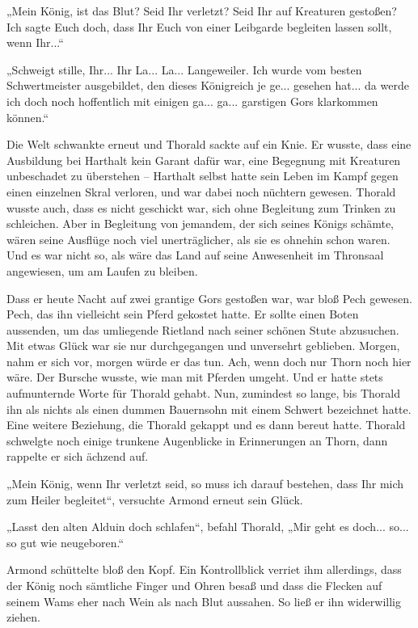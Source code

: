 „Mein König, ist das Blut? Seid Ihr verletzt? Seid Ihr auf Kreaturen gestoßen? Ich sagte Euch doch, dass Ihr Euch von einer Leibgarde begleiten lassen sollt, wenn Ihr...“

„Schweigt stille, Ihr... Ihr La... La... Langeweiler. Ich wurde vom besten Schwertmeister ausgebildet, den dieses Königreich je ge... gesehen hat... da werde ich doch noch hoffentlich mit einigen ga... ga... garstigen Gors klarkommen können.“

Die Welt schwankte erneut und Thorald sackte auf ein Knie. Er wusste, dass eine Ausbildung bei Harthalt kein Garant dafür war, eine Begegnung mit Kreaturen unbeschadet zu überstehen – Harthalt selbst hatte sein Leben im Kampf gegen einen einzelnen Skral verloren, und war dabei noch nüchtern gewesen. Thorald wusste auch, dass es nicht geschickt war, sich ohne Begleitung zum Trinken zu schleichen. Aber in Begleitung von jemandem, der sich seines Königs schämte, wären seine Ausflüge noch viel unerträglicher, als sie es ohnehin schon waren. Und es war nicht so, als wäre das Land auf seine Anwesenheit im Thronsaal angewiesen, um am Laufen zu bleiben.

Dass er heute Nacht auf zwei grantige Gors gestoßen war, war bloß Pech gewesen. Pech, das ihn vielleicht sein Pferd gekostet hatte. Er sollte einen Boten aussenden, um das umliegende Rietland nach seiner schönen Stute abzusuchen. Mit etwas Glück war sie nur durchgegangen und unversehrt geblieben. Morgen, nahm er sich vor, morgen würde er das tun. Ach, wenn doch nur Thorn noch hier wäre. Der Bursche wusste, wie man mit Pferden umgeht. Und er hatte stets aufmunternde Worte für Thorald gehabt. Nun, zumindest so lange, bis Thorald ihn als nichts als einen dummen Bauernsohn mit einem Schwert bezeichnet hatte. Eine weitere Beziehung, die Thorald gekappt und es dann bereut hatte. Thorald schwelgte noch einige trunkene Augenblicke in Erinnerungen an Thorn, dann rappelte er sich ächzend auf.

„Mein König, wenn Ihr verletzt seid, so muss ich darauf bestehen, dass Ihr mich zum Heiler begleitet“, versuchte Armond erneut sein Glück.

„Lasst den alten Alduin doch schlafen“, befahl Thorald, „Mir geht es doch... so... so gut wie neugeboren.“

Armond schüttelte bloß den Kopf. Ein Kontrollblick verriet ihm allerdings, dass der König noch sämtliche Finger und Ohren besaß und dass die Flecken auf seinem Wams eher nach Wein als nach Blut aussahen. So ließ er ihn widerwillig ziehen.




